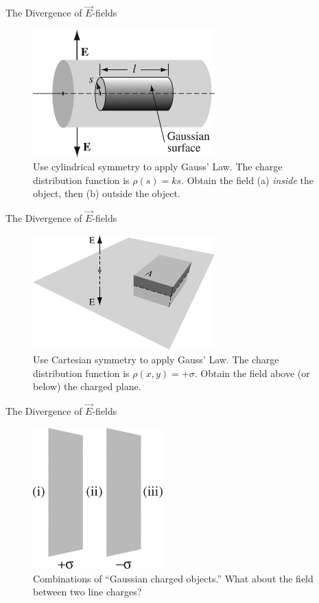 \documentclass{beamer}
\begin{document}
\begin{frame}{The Divergence of $\vec{E}$-fields}
\begin{figure}
\centering
\includegraphics[width=7cm]{figures/2_21.jpg}
\caption{\label{fig:cyl} Use cylindrical symmetry to apply Gauss' Law.  The charge distribution function is $\rho(s) = ks$.  Obtain the field (a) \textit{inside} the object, then (b) outside the object.}
\end{figure}
\end{frame}

\begin{frame}{The Divergence of $\vec{E}$-fields}
\begin{figure}
\centering
\includegraphics[width=7cm]{figures/2_22.jpg}
\caption{\label{fig:cyl2} Use Cartesian symmetry to apply Gauss' Law.  The charge distribution function is $\rho(x,y) = +\sigma$.  Obtain the field above (or below) the charged plane.}
\end{figure}
\end{frame}

\begin{frame}{The Divergence of $\vec{E}$-fields}
\begin{figure}
\centering
\includegraphics[width=5cm]{figures/2_23.jpg}
\caption{\label{fig:cyl3} Combinations of ``Gaussian charged objects.''  What about the field between two line charges?}
\end{figure}
\end{frame}
\end{document}
